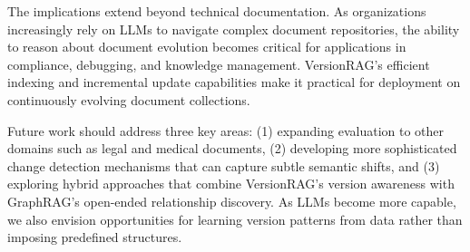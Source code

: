 The implications extend beyond technical documentation. As organizations increasingly rely on LLMs to navigate complex document repositories, the ability to reason about document evolution becomes critical for applications in compliance, debugging, and knowledge management. VersionRAG's efficient indexing and incremental update capabilities make it practical for deployment on continuously evolving document collections.

Future work should address three key areas: (1) expanding evaluation to other domains such as legal and medical documents, (2) developing more sophisticated change detection mechanisms that can capture subtle semantic shifts, and (3) exploring hybrid approaches that combine VersionRAG's version awareness with GraphRAG's open-ended relationship discovery. As LLMs become more capable, we also envision opportunities for learning version patterns from data rather than imposing predefined structures.


\clearpage
